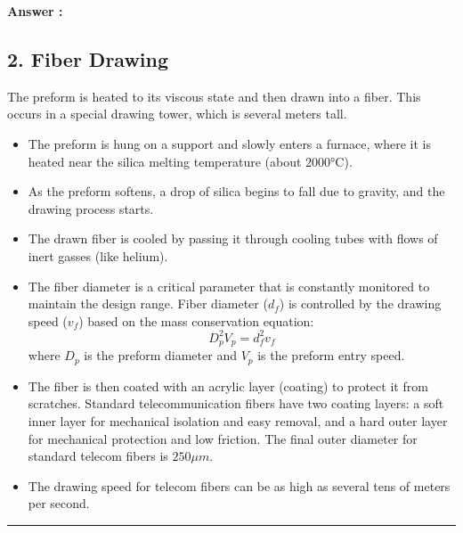 \documentclass[a4paper,11pt]{book}
\newcounter{qacount}
\newenvironment{answer}{
  \noindent\textbf{Answer \theqacount:}\space
}{
  \par\vspace{1em}   %
  \hrule             %
  \vspace{0.5em}     %
}
\begin{document}
\begin{answer}
    \subsection*{2. Fiber Drawing}
    The preform is heated to its viscous state and then drawn into a fiber. This occurs in a special drawing tower, which is several meters tall.
    \begin{itemize}
        \item The preform is hung on a support and slowly enters a furnace, where it is heated near the silica melting temperature (about 2000°C).
        \item As the preform softens, a drop of silica begins to fall due to gravity, and the drawing process starts.
        \item The drawn fiber is cooled by passing it through cooling tubes with flows of inert gasses (like helium).
        \item The fiber diameter is a critical parameter that is constantly monitored to maintain the design range. Fiber diameter ($d_f$) is controlled by the drawing speed ($v_f$) based on the mass conservation equation:
              \begin{equation}
                  D_p^{2}V_{p}=d_{f}^{2}v_{f}
              \end{equation}
              where $D_p$ is the preform diameter and $V_p$ is the preform entry speed.
        \item The fiber is then coated with an acrylic layer (coating) to protect it from scratches. Standard telecommunication fibers have two coating layers: a soft inner layer for mechanical isolation and easy removal, and a hard outer layer for mechanical protection and low friction. The final outer diameter for standard telecom fibers is $250 \mu m$.
        \item The drawing speed for telecom fibers can be as high as several tens of meters per second.
    \end{itemize}


\end{answer}
\end{document}
